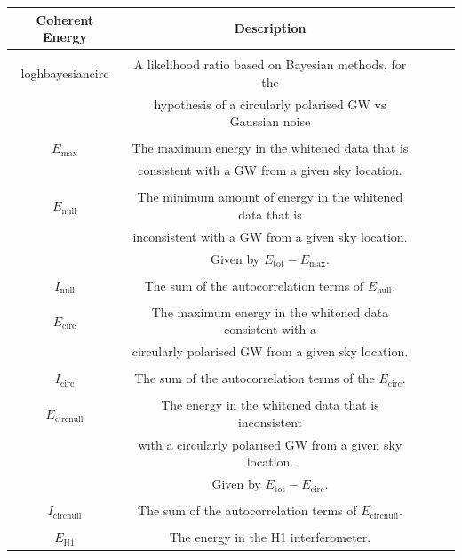 \documentclass[11pt]{cuthesis}
\begin{document}
 \begin{table}
\begin{tabular}{| c | c | c | c | c |} 
 \hline
\textbf{Coherent Energy }& \textbf{Description}  \\ [0.5ex] 
 \hline\hline
& \\ 
loghbayesiancirc & A likelihood ratio based on Bayesian methods, for the \\ & hypothesis of a circularly polarised GW vs Gaussian noise  \\

\hline
& \\
$E_\text{max}$ & The maximum energy in the whitened data that is \\ & consistent with a GW from a given sky location. \\

\hline
& \\
$E_\text{null}$& The minimum amount of energy in the whitened data that is\\ & inconsistent with a GW from a given sky location. \\ & Given by $E_\text{tot}-E_\text{max}$. \\
\hline
& \\
$I_\text{null}$& The sum of the autocorrelation terms of $E_\text{null}$. \\

\hline
& \\
$E_\text{circ}$ & The maximum energy in the whitened data consistent with a\\ & circularly polarised GW from a given sky location.  \\
\hline
& \\
$I_\text{circ}$ & The sum of the autocorrelation terms of the $E_\text{circ}$. \\

\hline
& \\
$E_\text{circnull}$ & The energy in the whitened data that is inconsistent \\ & with a circularly polarised GW from a given sky location. \\ & Given by $E_\text{tot}-E_\text{circ}$. \\

\hline
& \\
$I_\text{circnull}$& The sum of the autocorrelation terms of $E_\text{circnull}$.  \\
\hline
& \\
$E_\text{H1}$& The energy in the H1 interferometer. \\


\end{tabular}
\end{table}
\end{document}

